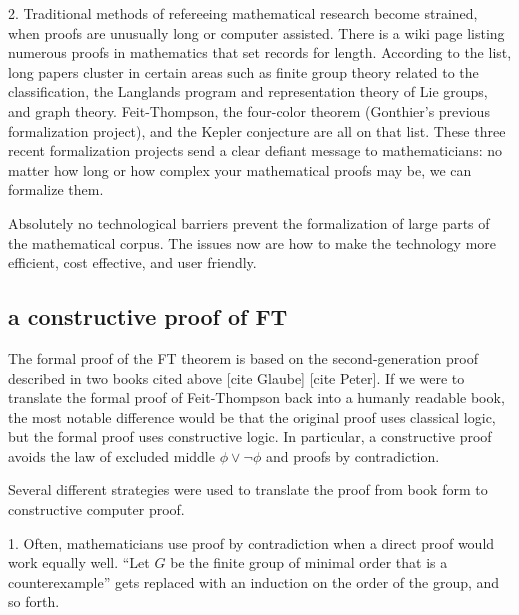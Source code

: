 \documentclass[brochure,english,12pt]{bourbaki}
\theoremstyle{plain}
\begin{document}


2. Traditional methods of refereeing mathematical research become strained, when
proofs are unusually long or computer assisted.  There is a wiki page listing numerous proofs
in mathematics that set records for length.
According to the list,
long papers cluster in certain areas
such as finite group theory related to the classification, 
the Langlands program and representation theory of Lie groups,
and graph theory.  Feit-Thompson, the four-color theorem (Gonthier's previous formalization
project), and the Kepler conjecture are all on that list. 
These three recent formalization projects send a clear defiant message  to mathematicians:
no matter how long or how complex your mathematical proofs may be, we can formalize them.

Absolutely no technological barriers 
prevent the formalization of large parts of the mathematical corpus.  The issues now
are how to make the technology more efficient, cost effective, and user friendly.



\subsection{a constructive proof of FT}

The formal proof of the FT theorem is based on the second-generation proof described in
two books cited above [cite Glaube] [cite Peter].
If we were to translate the formal proof of Feit-Thompson back into a humanly readable book, 
the most notable difference would be that the original proof uses classical logic,
but the formal proof uses constructive logic.  In particular, a constructive proof avoids
 the law of excluded middle $\phi\lor \neg \phi$ and proofs by contradiction.

Several different strategies were used to translate the proof from book form to
constructive computer proof.

1.  Often, mathematicians use proof by contradiction when a direct proof
would work equally well.  
``Let $G$ be the finite group of minimal order that is a counterexample'' gets
replaced with an induction on the order of the group, and so forth.
\end{document}
